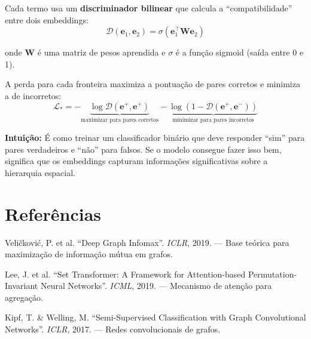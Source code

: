 \documentclass[a4paper,11pt]{article}
\begin{document}
Cada termo usa um \textbf{discriminador bilinear} que calcula a ``compatibilidade'' entre dois embeddings:
\begin{equation*}
\mathcal{D}(\mathbf{e}_1, \mathbf{e}_2) = \sigma(\mathbf{e}_1^\top \mathbf{W} \mathbf{e}_2)
\end{equation*}

onde $\mathbf{W}$ é uma matriz de pesos aprendida e $\sigma$ é a função sigmoid (saída entre 0 e 1).

A perda para cada fronteira maximiza a pontuação de pares corretos e minimiza a de incorretos:
\begin{equation*}
\mathcal{L}_{*} = -\underbrace{\log \mathcal{D}(\mathbf{e}^+, \mathbf{e}^+)}_{\text{maximizar para pares corretos}} - \underbrace{\log(1 - \mathcal{D}(\mathbf{e}^+, \mathbf{e}^-))}_{\text{minimizar para pares incorretos}}
\end{equation*}

\textbf{Intuição:} É como treinar um classificador binário que deve responder ``sim'' para pares verdadeiros e ``não'' para falsos. Se o modelo consegue fazer isso bem, significa que os embeddings capturam informações significativas sobre a hierarquia espacial.

\section{Referências}

\begin{enumerate}[label={[\arabic*]}, leftmargin=2em, itemsep=0.2em]
\item Veličković, P. et al. ``Deep Graph Infomax''. \textit{ICLR}, 2019. --- Base teórica para maximização de informação mútua em grafos.
\item Lee, J. et al. ``Set Transformer: A Framework for Attention-based Permutation-Invariant Neural Networks''. \textit{ICML}, 2019. --- Mecanismo de atenção para agregação.
\item Kipf, T. \& Welling, M. ``Semi-Supervised Classification with Graph Convolutional Networks''. \textit{ICLR}, 2017. --- Redes convolucionais de grafos.
\end{enumerate}
\end{document}
